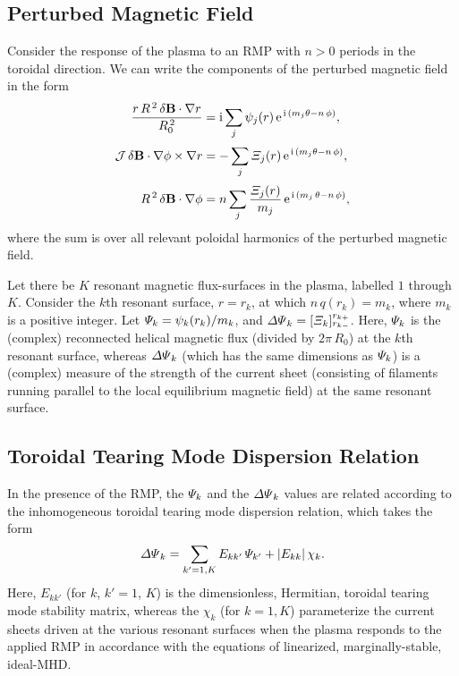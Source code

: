 \documentclass[notitlepage,12pt]{article}
\begin{document}
\subsection{Perturbed Magnetic Field}
Consider the response of the plasma to an RMP with $n>0$ periods in the toroidal direction.
We can write the components of the perturbed magnetic field in the form
\begin{align}
\frac{r\,R^{\,2}\,\delta{\bf B}\cdot\nabla r}{R_0^{\,2}}&= {\rm i}\sum_j \psi_j(r)\,{\rm e}^{\,{\rm i}\,(m_j\theta-n\,\phi)},\\[0.5ex]
{\cal J} \,\delta{\bf B}\cdot\nabla\phi\times \nabla r &= -\sum_j{\mit\Xi}_j(r)\,{\rm e}^{\,{\rm i}\,(m_j\theta-n\,\phi)},\\[0.5ex]
R^{\,2}\,\delta{\bf B}\cdot\nabla\phi&= n\sum_j \frac{{\mit\Xi}_j(r)}{m_j}\,{\rm e}^{\,{\rm i}\,(m_j\,\theta-n\,\phi)},
\end{align}
where the sum is over all relevant poloidal harmonics of the perturbed magnetic field. 

Let there be $K$ resonant magnetic flux-surfaces in the plasma, labelled $1$ through $K$.
Consider the $k$th resonant surface, $r=r_k$, at which $n\,q(r_k)= m_k$, where $m_k$ is a positive integer. Let
${\mit\Psi}_k = \psi_k(r_k)/m_k$, and 
${\mit\Delta\Psi}_k=[{\mit\Xi}_k]_{r_{k-}}^{r_{k+}}$.
Here, ${\mit\Psi}_k$ is the (complex) reconnected helical magnetic flux (divided by $2\pi\,R_0$) at the $k$th resonant surface, whereas ${\mit\Delta\Psi}_k$ (which has the same dimensions as ${\mit\Psi}_k$) is a (complex) 
measure of the strength of the current sheet (consisting of filaments running parallel to the local equilibrium magnetic
field) at the same resonant surface. 

\subsection{Toroidal Tearing Mode Dispersion Relation}\label{tear}
In the presence of the RMP, the ${\mit\Psi}_k$ and the ${\mit\Delta\Psi}_k$ values are related according to the inhomogeneous 
toroidal tearing mode dispersion relation, which takes the form
\begin{equation}\label{dispersion}
{\mit\Delta\Psi}_k = \sum_{k'=1,K} E_{kk'}\,{\mit\Psi}_{k'} + |E_{kk}|\,\chi_k.
\end{equation}
Here, $E_{kk'}$  (for $k$, $k'= 1$, $K$) is the dimensionless, Hermitian, toroidal tearing mode stability matrix, whereas the $\chi_k$ (for $k=1,K$) parameterize the current sheets driven at the various
resonant surfaces when the plasma responds  to the applied RMP in accordance with the equations of linearized, marginally-stable, ideal-MHD. 
\end{document}
